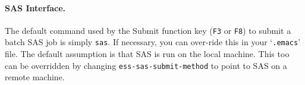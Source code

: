 \documentclass{article}
\newcommand{\stexttt}[1]{{\small\texttt{#1}}}
\newcommand{\elcode}[1]{\\{\stexttt{\hspace*{2em} #1}}\\}
\newenvironment{Salltt}{\small\begin{alltt}}{\end{alltt}}
\newcommand{\file}[1]{`\stexttt{#1}'}
\begin{document}
\paragraph{SAS Interface.}
\label{sec:SAS:interface}

The default command used by the Submit function key
(\stexttt{F3} or \stexttt{F8}) to
submit a batch SAS job is simply \stexttt{sas}.  If necessary, you can
over-ride this in your \file{.emacs} file.
The default assumption is that SAS is run on the local machine.  This too
can be overridden by changing \stexttt{ess-sas-submit-method} to point to
SAS on a remote machine.



% 
% 
\end{document}
